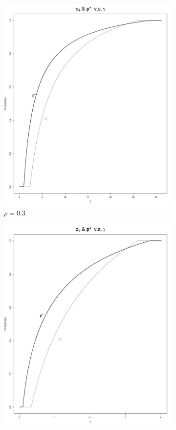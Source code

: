 \documentclass[11pt]{article}
\numberwithin{equation}{section}
\begin{document}
\newpage
\begin{figure}[h!]
	\centering
	\begin{subfigure}[b]{0.49\textwidth}
	\includegraphics[width=\textwidth]{plots/pe_vs_pstar_rev_0_3.png}
		\caption{$\rho=0.3$}
	\end{subfigure}
	\begin{subfigure}[b]{0.49\textwidth}
	\includegraphics[width=\textwidth]{plots/pe_vs_pstar_rev_0_6.png}

\end{subfigure}
\end{figure}
\end{document}
